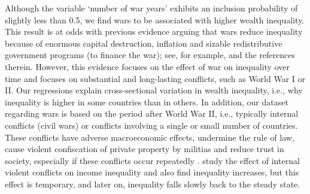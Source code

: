\begin{refsection}
Although the variable `number of war years' exhibits an inclusion probability of slightly less than 0.5, we find wars to be associated with higher wealth inequality. This result is at odds with previous evidence arguing that wars reduce inequality because of enormous capital destruction, inflation and sizable redistributive government programs (to finance the war); see, for example, \parencite{piketty2014,milanovic2016global} and the references therein. However, this evidence focuses on the effect of war on inequality over time and focuses on substantial and long-lasting conflicts, such as World War I or II. Our regressions explain cross-sectional variation in wealth inequality, i.e., why inequality is higher in some countries than in others. In addition, our dataset regarding wars is based on the period after World War II, i.e., typically internal conflicts (civil wars) or conflicts involving a single or small number of countries. These conflicts have adverse macroeconomic effects, undermine the rule of law, cause violent confiscation of private property by militias and reduce trust in society, especially if these conflicts occur repeatedly \parencite{bircanetal}. \textcite{bircanetal} study the effect of internal violent conflicts on income inequality and also find inequality increases, but this effect is temporary, and later on, inequality falls slowly back to the steady state.


\end{refsection}
